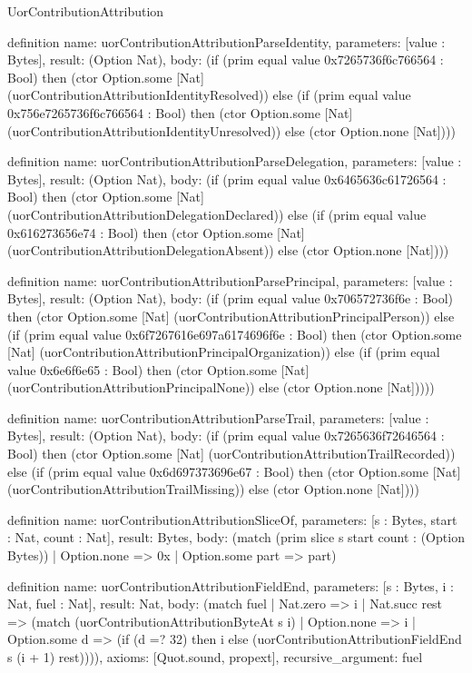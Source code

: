 \begin{lexlean}{UorContributionAttribution}
\begin{semanticmodule}
definition{
  name: uorContributionAttributionParseIdentity,
  parameters: [value : Bytes],
  result: (Option Nat),
  body: (if (prim equal value 0x7265736f6c766564 : Bool) then (ctor Option.some [Nat] (uorContributionAttributionIdentityResolved)) else (if (prim equal value 0x756e7265736f6c766564 : Bool) then (ctor Option.some [Nat] (uorContributionAttributionIdentityUnresolved)) else (ctor Option.none [Nat])))
}

definition{
  name: uorContributionAttributionParseDelegation,
  parameters: [value : Bytes],
  result: (Option Nat),
  body: (if (prim equal value 0x6465636c61726564 : Bool) then (ctor Option.some [Nat] (uorContributionAttributionDelegationDeclared)) else (if (prim equal value 0x616273656e74 : Bool) then (ctor Option.some [Nat] (uorContributionAttributionDelegationAbsent)) else (ctor Option.none [Nat])))
}

definition{
  name: uorContributionAttributionParsePrincipal,
  parameters: [value : Bytes],
  result: (Option Nat),
  body: (if (prim equal value 0x706572736f6e : Bool) then (ctor Option.some [Nat] (uorContributionAttributionPrincipalPerson)) else (if (prim equal value 0x6f7267616e697a6174696f6e : Bool) then (ctor Option.some [Nat] (uorContributionAttributionPrincipalOrganization)) else (if (prim equal value 0x6e6f6e65 : Bool) then (ctor Option.some [Nat] (uorContributionAttributionPrincipalNone)) else (ctor Option.none [Nat]))))
}

definition{
  name: uorContributionAttributionParseTrail,
  parameters: [value : Bytes],
  result: (Option Nat),
  body: (if (prim equal value 0x7265636f72646564 : Bool) then (ctor Option.some [Nat] (uorContributionAttributionTrailRecorded)) else (if (prim equal value 0x6d697373696e67 : Bool) then (ctor Option.some [Nat] (uorContributionAttributionTrailMissing)) else (ctor Option.none [Nat])))
}

definition{
  name: uorContributionAttributionSliceOf,
  parameters: [s : Bytes, start : Nat, count : Nat],
  result: Bytes,
  body: (match (prim slice s start count : (Option Bytes))
    | Option.none => 0x
    | Option.some part => part)
}

definition{
  name: uorContributionAttributionFieldEnd,
  parameters: [s : Bytes, i : Nat, fuel : Nat],
  result: Nat,
  body: (match fuel
    | Nat.zero => i
    | Nat.succ rest => (match (uorContributionAttributionByteAt s i)
      | Option.none => i
      | Option.some d => (if (d =? 32) then i else (uorContributionAttributionFieldEnd s (i + 1) rest)))),
  axioms: [Quot.sound, propext],
  recursive_argument: fuel
}


\end{semanticmodule}
\end{lexlean}
